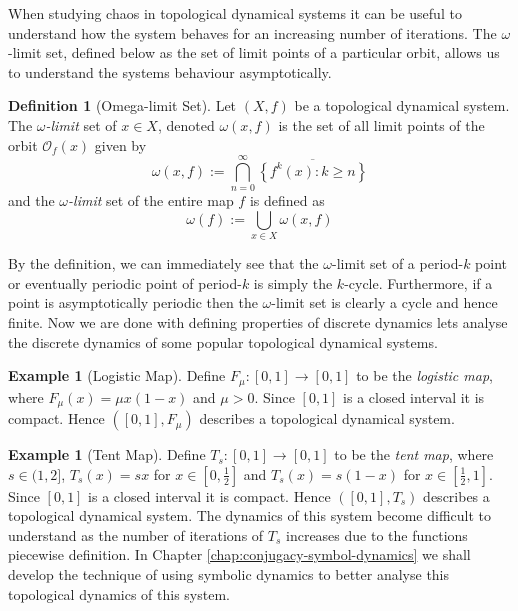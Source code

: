 \documentclass[11pt,a4paper,oneside]{memoir}
\theoremstyle{plain}
\theoremstyle{definition}
\newtheorem{defn}[thm]{Definition}
\newtheorem{exmp}[thm]{Example}
\begin{document}
When studying chaos in topological dynamical systems it can be useful to understand how the system behaves for an increasing number of iterations. The $\omega$-limit set, defined below as the set of limit points of a particular orbit, allows us to understand the systems behaviour asymptotically.

\begin{defn}[Omega-limit Set] \label{defn:omega-limit-set}
    Let $(X, f)$ be a topological dynamical system. The $\omega$\emph{-limit} set of $x \in X$, denoted $\omega(x, f)$ is the set of all limit points of the orbit $\mathcal{O}_f(x)$ given by \[\omega(x, f) := \bigcap_{n=0}^\infty\overline{\left\lbrace f^k(x) : k \geq n \right\rbrace}\] and the $\omega$\emph{-limit} set of the entire map $f$ is defined as \[\omega(f) := \bigcup_{x \in X} \omega(x, f)\]
\end{defn}

By the definition, we can immediately see that the $\omega$-limit set of a period-$k$ point or eventually periodic point of period-$k$ is simply the $k$-cycle. Furthermore, if a point is asymptotically periodic then the $\omega$-limit set is clearly a cycle and hence finite. Now we are done with defining properties of discrete dynamics lets analyse the discrete dynamics of some popular topological dynamical systems.

\begin{exmp}[Logistic Map] \label{exmp:logitic-map}
    Define $F_{\mu}: [0, 1] \to [0, 1]$ to be the \emph{logistic map}, where $F_{\mu}(x)=\mu x(1-x)$ and $\mu > 0$. Since $[0, 1]$ is a closed interval it is compact. Hence $([0, 1], F_{\mu})$ describes a topological dynamical system.
\end{exmp}

\begin{exmp}[Tent Map] \label{exmp:tent-map}
    Define $T_s: [0, 1] \to [0,1]$ to be the \emph{tent map}, where $s \in (1, 2]$, $T_s(x) = sx$ for $x \in \left[0, \frac{1}{2}\right]$ and $T_s(x) = s(1-x)$ for $x \in \left[\frac{1}{2}, 1\right]$. Since $[0, 1]$ is a closed interval it is compact. Hence $([0, 1], T_s)$ describes a topological dynamical system. The dynamics of this system become difficult to understand as the number of iterations of $T_s$ increases due to the functions piecewise definition. In Chapter \ref{chap:conjugacy-symbol-dynamics} we shall develop the technique of using symbolic dynamics to better analyse this topological dynamics of this system.
\end{exmp}
\end{document}
